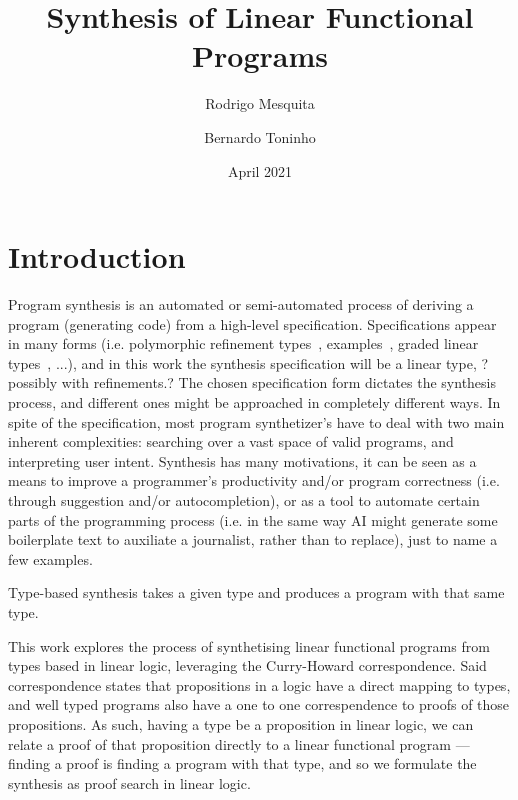 \documentclass{llncs}
\title{Synthesis of Linear Functional Programs}
\author{Rodrigo Mesquita \and Bernardo Toninho}
\date{April 2021}
\institute{NOVA School of Science and Technology}
\begin{document}
\maketitle

\section{Introduction}

Program synthesis is an automated or semi-automated process of
 deriving a program (generating code) from a high-level specification.
 Specifications appear in many forms (i.e.
 polymorphic refinement types~\cite{DBLP:conf/pldi/PolikarpovaKS16},
 examples~\cite{DBLP:conf/popl/FrankleOWZ16},
 graded linear types~\cite{DBLP:conf/lopstr/HughesO20}, ...),
 and in this work the synthesis specification will be a linear type, ?possibly with refinements.?
 The chosen specification form dictates the synthesis process, and different ones might
 be approached in completely different ways.
 In spite of the specification, most program synthetizer's have to deal with two main
 inherent complexities: searching over a vast space of valid programs, and interpreting user intent.
 Synthesis has many motivations, it can be seen as a means to improve a programmer's productivity and/or
 program correctness (i.e. through suggestion and/or autocompletion), or as a tool to automate certain parts
 of the programming process (i.e. in the same way AI might generate some boilerplate text to auxiliate a journalist, rather
 than to replace), just to name a few examples.

Type-based synthesis takes a given type and produces a program with that same type. 
 

This work explores the process of synthetising linear functional
programs from types based in linear logic, leveraging the Curry-Howard correspondence.
Said correspondence states that propositions in a logic have a direct mapping to types,
 and well typed programs also have a one to one correspendence to proofs of those propositions.
As such, having a type be a proposition in linear logic, we can relate a proof of that
proposition directly to a linear functional program
 — finding a proof is finding a program with that type, and so we
 formulate the synthesis as proof search in linear logic.
\end{document}
